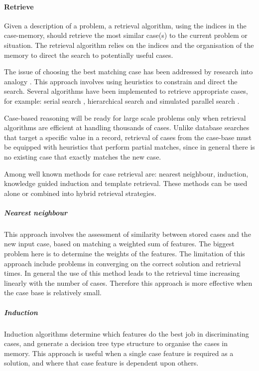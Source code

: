 \paragraph{Retrieve}
\label{Retrieve} 
Given a description of a problem, a retrieval algorithm, using the indices in the case-memory, 
should retrieve the most similar case(s) to the current problem or situation. The retrieval algorithm 
relies on the indices and the organisation of the memory to direct the search to potentially useful cases.

The issue of choosing the best matching case has been addressed by research into analogy \cite{Falkenehainer_1986}. 
This approach involves using heuristics to constrain and direct the search. Several algorithms have 
been implemented to retrieve appropriate cases, for example: serial search 
\cite{Navinchandar_1991, Acorn_Walden_1992, Simoudis_93}, hierarchical search 
\cite{Maher_Zhang_1991} and simulated parallel search \cite{Domeshek_1993}.

Case-based reasoning will be ready for large scale problems only when retrieval algorithms
are efficient at handling thousands of cases. Unlike database searches that target a specific
 value in a record, retrieval of cases from the case-base must be equipped with heuristics 
that perform partial matches, since in general there is no existing case that exactly matches the new case.

Among well known methods for case retrieval are: nearest neighbour, induction, 
knowledge guided induction and template retrieval. These methods can be used 
alone or combined into hybrid retrieval strategies.

\subparagraph{Nearest neighbour}
\label{nearest neighbour}This approach involves the assessment of similarity 
between stored cases and the new input case, based on matching a weighted sum 
of features. The biggest problem here is to determine the weights of the features. 
The limitation of this approach include problems in converging on the 
correct solution and retrieval times. In general the use of this method leads 
to the retrieval time increasing linearly with the number of cases. Therefore 
this approach is more effective when the case base is relatively small. 

\subparagraph{Induction}
\label{Induction}Induction algorithms determine which features do the best job 
in discriminating cases, and generate a decision tree type structure to organise 
the cases in memory. This approach is useful when a single case feature is 
required as a solution, and where that case feature is dependent upon others.


